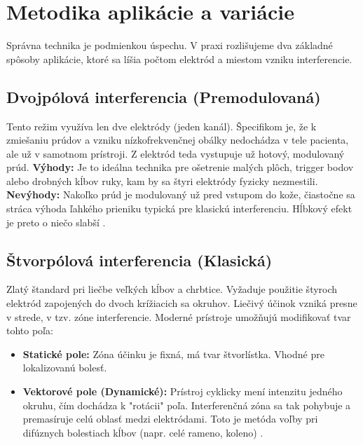 \section{Metodika aplikácie a variácie}

Správna technika je podmienkou úspechu. V praxi rozlišujeme dva základné spôsoby aplikácie, ktoré sa líšia počtom elektród a miestom vzniku interferencie.

\subsection{Dvojpólová interferencia (Premodulovaná)}
Tento režim využíva len dve elektródy (jeden kanál). Špecifikom je, že k zmiešaniu prúdov a vzniku nízkofrekvenčnej obálky nedochádza v tele pacienta, ale už v samotnom prístroji. Z elektród teda vystupuje už hotový, modulovaný prúd.
\textbf{Výhody:} Je to ideálna technika pre ošetrenie malých plôch, trigger bodov alebo drobných kĺbov ruky, kam by sa štyri elektródy fyzicky nezmestili.
\textbf{Nevýhody:} Nakoľko prúd je modulovaný už pred vstupom do kože, čiastočne sa stráca výhoda ľahkého prieniku typická pre klasickú interferenciu. Hĺbkový efekt je preto o niečo slabší \parencite{Watson2020}.

\subsection{Štvorpólová interferencia (Klasická)}
Zlatý štandard pri liečbe veľkých kĺbov a chrbtice. Vyžaduje použitie štyroch elektród zapojených do dvoch krížiacich sa okruhov. Liečivý účinok vzniká presne v strede, v tzv. zóne interferencie.
Moderné prístroje umožňujú modifikovať tvar tohto poľa:
\begin{itemize}
    \item \textbf{Statické pole:} Zóna účinku je fixná, má tvar štvorlístka. Vhodné pre lokalizovanú bolesť.
    \item \textbf{Vektorové pole (Dynamické):} Prístroj cyklicky mení intenzitu jedného okruhu, čím dochádza k "rotácii" poľa. Interferenčná zóna sa tak pohybuje a premasíruje celú oblasť medzi elektródami. Toto je metóda voľby pri difúznych bolestiach kĺbov (napr. celé rameno, koleno) \parencite{Navratil2019}.
\end{itemize}

